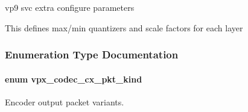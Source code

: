 vp9 svc extra configure parameters 

This defines max/min quantizers and scale factors for each layer 

\subsubsection{Enumeration Type Documentation}
\paragraph[{\texorpdfstring{vpx\+\_\+codec\+\_\+cx\+\_\+pkt\+\_\+kind}{vpx_codec_cx_pkt_kind}}]{\setlength{\rightskip}{0pt plus 5cm}enum {\bf vpx\+\_\+codec\+\_\+cx\+\_\+pkt\+\_\+kind}}\hypertarget{group__encoder_ga28a79375279536526552af3a83d2ed72}{}\label{group__encoder_ga28a79375279536526552af3a83d2ed72}


Encoder output packet variants. 

